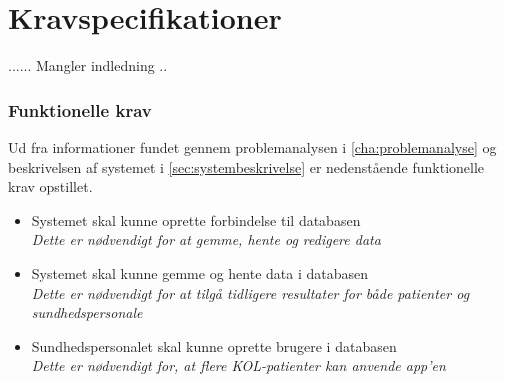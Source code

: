 \section{Kravspecifikationer} \label{sec:funktionellekrav}

...... Mangler indledning .. 
\subsubsection{Funktionelle krav}
Ud fra informationer fundet gennem problemanalysen i \autoref{cha:problemanalyse} og beskrivelsen af systemet i \autoref{sec:systembeskrivelse} er nedenstående funktionelle krav opstillet. 



\noindent
\begin{itemize}
\item Systemet skal kunne oprette forbindelse til databasen
	\\
	\textit{Dette er nødvendigt for at gemme, hente og redigere data}

\item Systemet skal kunne gemme og hente data i databasen
	\\
	\textit{Dette er nødvendigt for at tilgå tidligere resultater for både patienter og sundhedspersonale}	
\item Sundhedspersonalet skal kunne oprette brugere i databasen
	\\
	\textit{Dette er nødvendigt for, at flere KOL-patienter kan anvende app'en}
\end{itemize}
	
